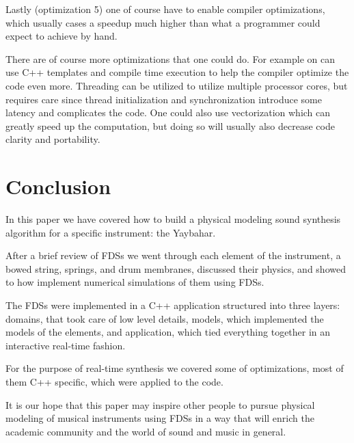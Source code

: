 \documentclass{article}
\begin{document}
Lastly (optimization 5) one of course have to enable compiler optimizations, which usually cases a speedup much higher than what a programmer could expect to achieve by hand.

There are of course more optimizations that one could do\cite{webb_limits_2015}.
For example on can use C++ templates and compile time execution to help the compiler optimize the code even more.
Threading can be utilized to utilize multiple processor cores, but requires care since thread initialization and synchronization introduce some latency and complicates the code. 
One could also use vectorization which can greatly speed up the computation, but doing so will usually also decrease code clarity and portability. 

\section{Conclusion}
\label{sec:conclusion}

In this paper we have covered how to build a physical modeling sound synthesis algorithm for a specific instrument: the Yaybahar.

After a brief review of FDSs we went through each element of the instrument, a bowed string, springs, and drum membranes, discussed their physics, and showed to how implement numerical simulations of them using FDSs.

The FDSs were implemented in a C++ application structured into three layers: domains, that took care of low level details, models, which implemented the models of the elements, and application, which tied everything together in an interactive real-time fashion.

For the purpose of real-time synthesis we covered some of optimizations, most of them C++ specific, which were applied to the code.

It is our hope that this paper may inspire other people to pursue physical modeling of musical instruments using FDSs in a way that will enrich the academic community and the world of sound and music in general.

{
\small

}
\end{document}
